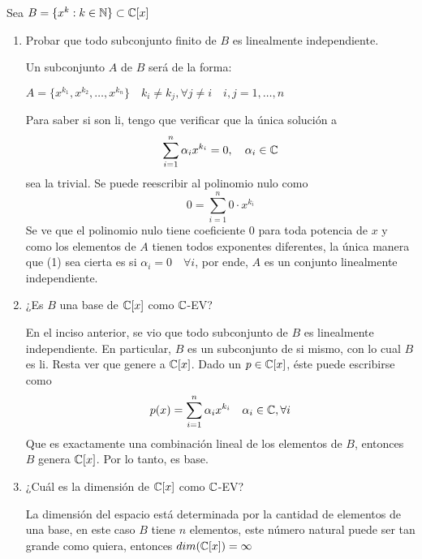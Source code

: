 \item Sea $B=\{x^k:k\in\mathbb{N}\}\subset\mathbb{C}[x]$
    \begin{enumerate}
        \item Probar que todo subconjunto finito de $B$ es linealmente independiente.
            \begin{mdframed}[style=s]
                Un subconjunto $A$ de $B$ será de la forma: 
                \begin{center}
                    $A=\{x^{k_1},x^{k_2},\dots,x^{k_n}\}\quad k_i\neq k_j,\forall j\neq i\quad i,j=1,\dots,n$    
                \end{center}
                Para saber si son li, tengo que verificar que la única solución a 
                \begin{equation}
                    \sum_{i=1}^n\alpha_ix^{k_i}=0,\quad \alpha_i\in\mathbb{C}
                \end{equation}
                sea la trivial. Se puede reescribir al polinomio nulo como
                \begin{equation*}
                    0=\sum_{i=1}^n0\cdot x^{k_i}
                \end{equation*}
                Se ve que el polinomio nulo tiene coeficiente 0 para toda potencia de $x$ y como los elementos de $A$ tienen todos exponentes diferentes, la única manera que (1) sea cierta es si $\alpha_i=0\quad\forall i$, por ende, $A$ es un conjunto linealmente independiente.
            \end{mdframed}
        \item ¿Es $B$ una base de $\mathbb{C}[x]$ como $\mathbb{C}$-EV?
            \begin{mdframed}[style=s]
                En el inciso anterior, se vio que todo subconjunto de $B$ es linealmente independiente. En particular, $B$ es un subconjunto de si mismo, con lo cual $B$ es li. Resta ver que genere a $\mathbb{C}[x]$. Dado un $p\in\mathbb{C}[x]$, éste puede escribirse como 
                \begin{equation*}
                    p(x)=\sum_{i=1}^n\alpha_ix^{k_i}\quad \alpha_i\in\mathbb{C},\forall i
                \end{equation*}
                Que es exactamente una combinación lineal de los elementos de $B$, entonces $B$ genera $\mathbb{C}[x]$. Por lo tanto, es base.
            \end{mdframed}
        \item ¿Cuál es la dimensión de $\mathbb{C}[x]$ como $\mathbb{C}$-EV?
            \begin{mdframed}[style=s]
                La dimensión del espacio está determinada por la cantidad de elementos de una base, en este caso $B$ tiene $n$ elementos, este número natural puede ser tan grande como quiera, entonces $dim(\mathbb{C}[x])=\infty$
            \end{mdframed}
    \end{enumerate}